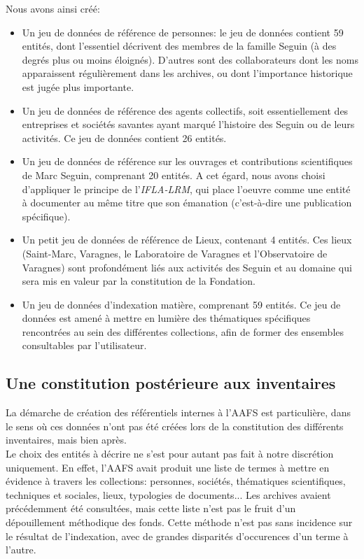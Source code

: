 \documentclass[a4paper,12pt,twoside]{book}
\begin{document}
Nous avons ainsi créé: 
\begin{itemize}
     \item Un jeu de données de référence de personnes: le jeu de données contient 59 entités, dont l'essentiel décrivent des membres de la famille Seguin (à des degrés plus ou moins éloignés). D'autres sont des collaborateurs dont les noms apparaissent régulièrement dans les archives, ou dont l'importance historique est jugée plus importante.
     \item Un jeu de données de référence des agents collectifs, soit essentiellement des entreprises et sociétés savantes ayant marqué l'histoire des Seguin ou de leurs activités. Ce jeu de données contient 26 entités.
     \item Un jeu de données de référence sur les ouvrages et contributions scientifiques de Marc Seguin, comprenant 20 entités. A cet égard, nous avons choisi d'appliquer le principe de l'\textit{IFLA-LRM}, qui place l'oeuvre comme une entité à documenter au même titre que son émanation (c'est-à-dire une publication spécifique). 
     \item Un petit jeu de données de référence de Lieux, contenant 4 entités. Ces lieux (Saint-Marc, Varagnes, le Laboratoire de Varagnes et l'Observatoire de Varagnes) sont profondément liés aux activités des Seguin et au domaine qui sera mis en valeur par la constitution de la Fondation.
     \item Un jeu de données d'indexation matière, comprenant 59 entités. Ce jeu de données est amené à mettre en lumière des thématiques spécifiques rencontrées au sein des différentes collections, afin de former des ensembles consultables par l'utilisateur. 
\end{itemize}

\subsection{Une constitution postérieure aux inventaires}

La démarche de création des référentiels internes à l'AAFS est particulière, dans le sens où ces données n'ont pas été créées lors de la constitution des différents inventaires, mais bien après.\\

Le choix des entités à décrire ne s'est pour autant pas fait à notre discrétion uniquement. En effet, l'AAFS avait produit une liste de termes à mettre en évidence à travers les collections: personnes, sociétés, thématiques scientifiques, techniques et sociales, lieux, typologies de documents... Les archives avaient précédemment été consultées, mais cette liste n'est pas le fruit d'un dépouillement méthodique des fonds. Cette méthode n'est pas sans incidence sur le résultat de l'indexation, avec de grandes disparités d'occurences d'un terme à l'autre.\\
\end{document}
